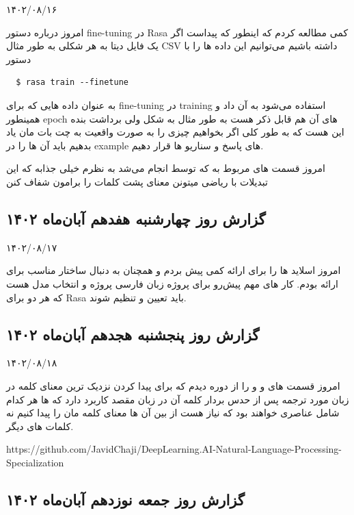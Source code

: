 ۱۴۰۲/۰۸/۱۶

امروز درباره دستور fine-tuning در Rasa کمی مطالعه کردم که اینطور که پیداست اگر یک فایل دیتا به هر شکلی به طور مثال CSV داشته باشیم می‌توانیم این داده ها را با دستور 
\begin{verbatim}
  $ rasa train --finetune
\end{verbatim}
به عنوان داده هایی که برای fine-tuning در training استفاده می‌شود به آن داد و همینطور epoch های آن هم قابل ذکر هست به طور مثال به شکل  ولی برداشت بنده این هست که به طور کلی اگر بخواهیم چیزی را به صورت واقعیت به چت بات مان یاد بدهیم باید آن ها را در example های پاسخ و سناریو ها قرار دهیم.

امروز قسمت های مربوط به  که توسط  انجام می‌شد به نظرم خیلی جذابه که این تبدیلات با ریاضی میتونن معنای پشت کلمات را برامون شفاف کنن


\subsection{گزارش روز چهارشنبه هفدهم آبان‌ماه ۱۴۰۲}

۱۴۰۲/۰۸/۱۷

امروز اسلاید ها را برای ارائه کمی پیش بردم و همچنان به دنبال ساختار مناسب برای ارائه بودم. کار های مهم پیش‌رو برای پروژه زبان فارسی پروژه و انتخاب مدل هست که هر دو برای Rasa باید تعیین و تنظیم شوند.


\subsection{گزارش روز پنجشنبه هجدهم آبان‌ماه ۱۴۰۲}

۱۴۰۲/۰۸/۱۸

امروز قسمت های  و  و  را از دوره  دیدم که برای پیدا کردن نزدیک ترین معنای کلمه در زبان مورد ترجمه پس از حدس بردار کلمه آن در زبان مقصد کاربرد دارد که  ها هر کدام شامل عناصری خواهند بود که نیاز هست از بین آن ها معنای کلمه مان را پیدا کنیم نه کلمات  های دیگر.

https://github.com/JavidChaji/DeepLearning.AI-Natural-Language-Processing-Specialization


\subsection{گزارش روز جمعه نوزدهم آبان‌ماه ۱۴۰۲}

